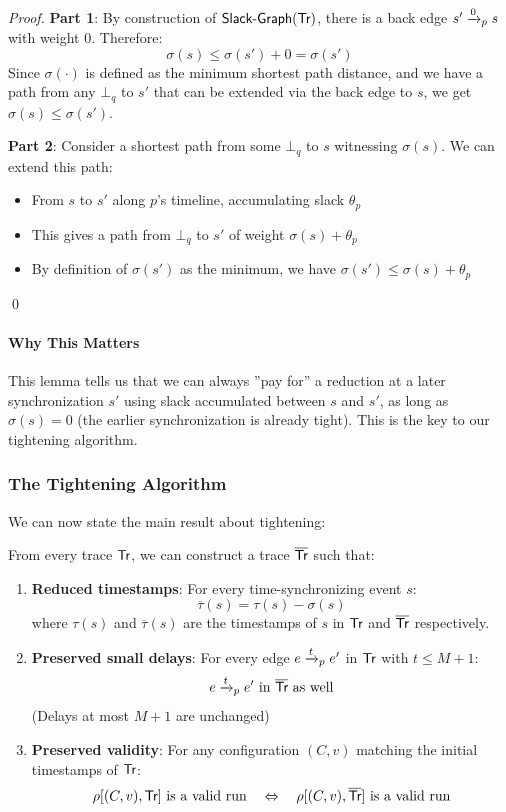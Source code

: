 \begin{proof}
\textbf{Part 1}: By construction of $\mathrm{\textsf{Slack-Graph}}(\textsf{Tr})$, there is a back edge $s' \xrightarrow{0}_p s$ with weight 0. Therefore:
\[
\sigma(s) \leq \sigma(s') + 0 = \sigma(s')
\]
Since $\sigma(\cdot)$ is defined as the minimum shortest path distance, and we have a path from any $\bot_q$ to $s'$ that can be extended via the back edge to $s$, we get $\sigma(s) \leq \sigma(s')$.

\textbf{Part 2}: Consider a shortest path from some $\bot_q$ to $s$ witnessing $\sigma(s)$. We can extend this path:
\begin{itemize}
\item From $s$ to $s'$ along $p$'s timeline, accumulating slack $\theta_p$
\item This gives a path from $\bot_q$ to $s'$ of weight $\sigma(s) + \theta_p$
\item By definition of $\sigma(s')$ as the minimum, we have $\sigma(s') \leq \sigma(s) + \theta_p$
\end{itemize}
\qed
\end{proof}

\paragraph*{Why This Matters}

This lemma tells us that we can always ''pay for'' a reduction at a later synchronization $s'$ using slack accumulated between $s$ and $s'$, as long as $\sigma(s) = 0$ (the earlier synchronization is already tight). This is the key to our tightening algorithm.

\subsubsection{The Tightening Algorithm}

We can now state the main result about tightening:

\begin{lemma}\label{lem:tightening}
From every trace $\textsf{Tr}$, we can construct a trace $\overline{\textsf{Tr}}$ such that:
\begin{enumerate}
\item \textbf{Reduced timestamps}: For every time-synchronizing event $s$:
  \[
  \overline{\tau}(s) = \tau(s) - \sigma(s)
  \]
  where $\tau(s)$ and $\overline{\tau}(s)$ are the timestamps of $s$ in $\textsf{Tr}$ and $\overline{\textsf{Tr}}$ respectively.

\item \textbf{Preserved small delays}: For every edge $e \xrightarrow{t}_p e'$ in $\textsf{Tr}$ with $t \leq M+1$:
  \[
  e \xrightarrow{t}_p e' \text{ in } \overline{\textsf{Tr}} \text{ as well}
  \]
  (Delays at most $M+1$ are unchanged)

\item \textbf{Preserved validity}: For any configuration $(C,v)$ matching the initial timestamps of $\textsf{Tr}$:
  \[
  \rho[(C,v), \textsf{Tr}] \text{ is a valid run} \quad \Leftrightarrow \quad \rho[(C,v), \overline{\textsf{Tr}}] \text{ is a valid run}
  \]
\end{enumerate}
\end{lemma}

